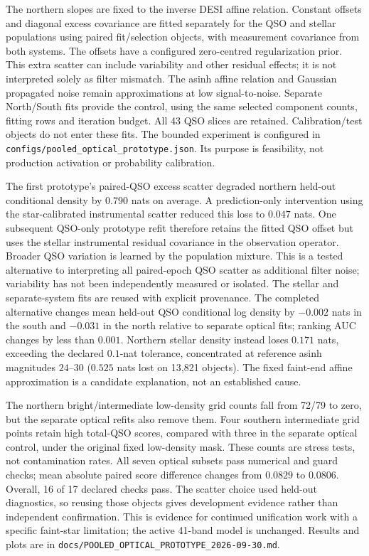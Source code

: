 \documentclass[11pt,a4paper]{article}
\begin{document}
The northern slopes are fixed to the inverse DESI affine relation. Constant
offsets and diagonal excess covariance are fitted separately for the QSO and
stellar populations using paired fit/selection objects, with measurement
covariance from both systems. The offsets have a configured zero-centred
regularization prior. This extra scatter can include variability and other
residual effects; it is not interpreted solely as filter mismatch. The asinh
affine relation and Gaussian propagated noise remain approximations at low
signal-to-noise. Separate North/South fits provide the control, using the same
selected component counts, fitting rows and iteration budget. All 43 QSO
slices are retained. Calibration/test objects do not enter these fits.
The bounded experiment is configured in
\texttt{configs/pooled\_optical\_prototype.json}. Its purpose is feasibility,
not production activation or probability calibration.

The first prototype's paired-QSO excess scatter degraded northern held-out
conditional density by $0.790$ nats on average. A prediction-only intervention
using the star-calibrated instrumental scatter reduced this loss to $0.047$
nats. One subsequent QSO-only prototype refit therefore retains the fitted
QSO offset but uses the stellar instrumental residual covariance in the
observation operator. Broader QSO variation is learned by the population
mixture. This is a tested alternative to interpreting all paired-epoch QSO
scatter as additional filter noise; variability has not been independently
measured or isolated. The stellar and separate-system fits are reused with
explicit provenance. The completed alternative changes mean held-out QSO
conditional log density by $-0.002$ nats in the south and $-0.031$ in the north
relative to separate optical fits; ranking AUC changes by less than $0.001$.
Northern stellar density instead loses $0.171$ nats, exceeding the declared
$0.1$-nat tolerance, concentrated at reference asinh magnitudes $24$--$30$
($0.525$ nats lost on 13,821 objects). The fixed faint-end affine approximation
is a candidate explanation, not an established cause.

The northern bright/intermediate low-density grid counts fall from 72/79 to
zero, but the separate optical refits also remove them. Four southern
intermediate grid points retain high total-QSO scores, compared with three in
the separate optical control, under the original fixed low-density mask.
These counts are stress tests, not contamination rates. All seven optical
subsets pass numerical and guard checks; mean absolute paired score difference
changes from $0.0829$ to $0.0806$. Overall, 16 of 17 declared checks pass.
The scatter choice used held-out diagnostics, so reusing those objects gives
development evidence rather than independent confirmation. This is evidence
for continued unification work with a specific faint-star limitation; the
active 41-band model is unchanged. Results and plots are in
\texttt{docs/POOLED\_OPTICAL\_PROTOTYPE\_2026-09-30.md}.
\end{document}
